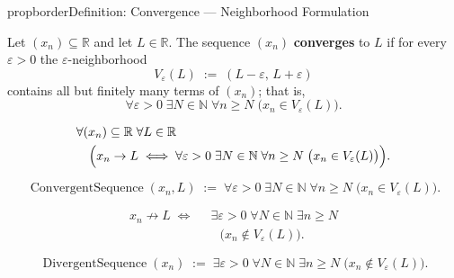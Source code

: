\begin{bpnew}{propborder}{Definition: Convergence --- Neighborhood Formulation}
\begin{definition}
\label{def:convergent-sequence-neighborhood}

Let $(x_n) \subseteq \mathbb{R}$ and let $L \in \mathbb{R}$. The sequence
$(x_n)$ \textbf{converges} to $L$ if for every $\varepsilon > 0$ the
$\varepsilon$-neighborhood
\[
    V_\varepsilon(L) \;:=\; (L - \varepsilon,\, L + \varepsilon)
\]
contains all but finitely many terms of $(x_n)$; that is,
\[
    \forall \varepsilon > 0 \;\exists N \in \mathbb{N} \;\forall n \ge N
    \;\bigl(x_n \in V_\varepsilon(L)\bigr).
\]
\end{definition}
\end{bpnew}

\begin{remark*}
\[
\begin{aligned}
&\forall (x_n) \subseteq \mathbb{R} \;\forall L \in \mathbb{R}\\
&\quad\Bigl(
    x_n \to L
    \;\Longleftrightarrow\;
    \forall \varepsilon > 0 \;\exists N \in \mathbb{N} \;\forall n \ge N
    \;\bigl(x_n \in V_\varepsilon(L)\bigr)
\Bigr).
\end{aligned}
\]
\end{remark*}

\begin{remark*}
\[
\operatorname{ConvergentSequence}(x_n, L)
\;:=\;
\forall \varepsilon > 0 \;\exists N \in \mathbb{N} \;\forall n \ge N
\;\bigl(x_n \in V_\varepsilon(L)\bigr).
\]
\end{remark*}

\begin{remark*}
\[
\begin{aligned}
x_n \not\to L
\;\Longleftrightarrow\;
&\;\exists \varepsilon > 0 \;\forall N \in \mathbb{N} \;\exists n \ge N\\
&\quad\bigl(x_n \notin V_\varepsilon(L)\bigr).
\end{aligned}
\]
\end{remark*}

\begin{remark*}
\[
\operatorname{DivergentSequence}(x_n)
\;:=\;
\exists \varepsilon > 0 \;\forall N \in \mathbb{N} \;\exists n \ge N
\;\bigl(x_n \notin V_\varepsilon(L)\bigr).
\]
\end{remark*}

